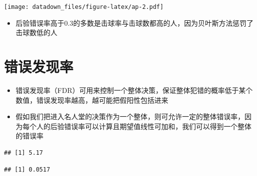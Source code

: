 \documentclass[]{book}
\newenvironment{Shaded}{\begin{snugshade}}{\end{snugshade}}
\newcommand{\CommentTok}[1]{\textcolor[rgb]{0.56,0.35,0.01}{\textit{#1}}}
\newcommand{\DecValTok}[1]{\textcolor[rgb]{0.00,0.00,0.81}{#1}}
\newcommand{\KeywordTok}[1]{\textcolor[rgb]{0.13,0.29,0.53}{\textbf{#1}}}
\newcommand{\NormalTok}[1]{#1}
\newcommand{\OperatorTok}[1]{\textcolor[rgb]{0.81,0.36,0.00}{\textbf{#1}}}
\newcommand{\StringTok}[1]{\textcolor[rgb]{0.31,0.60,0.02}{#1}}
\providecommand{\tightlist}{%
  \setlength{\itemsep}{0pt}\setlength{\parskip}{0pt}}
\begin{document}
\texttt{[image: datadown\_files/figure-latex/ap-2.pdf]}

\begin{itemize}
\tightlist
\item
  后验错误率高于0.3的多数是击球率与击球数都高的人，因为贝叶斯方法惩罚了击球数低的人
\end{itemize}

\hypertarget{ux9519ux8befux53d1ux73b0ux7387}{%
\section{错误发现率}\label{ux9519ux8befux53d1ux73b0ux7387}}

\begin{itemize}
\item
  错误发现率（FDR）可用来控制一个整体决策，保证整体犯错的概率低于某个数值，错误发现率越高，越可能把假阳性包括进来
\item
  假如我们把进入名人堂的决策作为一个整体，则可允许一定的整体错误率，因为每个人的后验错误率可以计算且期望值线性可加和，我们可以得到一个整体的错误率
\end{itemize}

\begin{Shaded}
\end{Shaded}

\begin{verbatim}
## [1] 5.17
\end{verbatim}

\begin{Shaded}
\end{Shaded}

\begin{verbatim}
## [1] 0.0517
\end{verbatim}

\begin{Shaded}
\end{Shaded}
\end{document}
